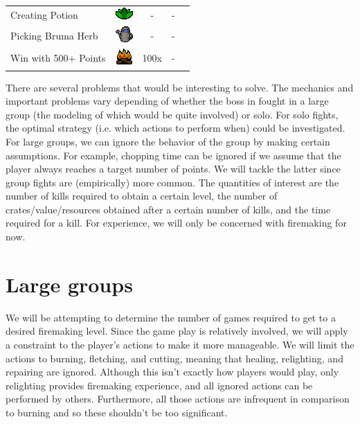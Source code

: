 \begin{table}[H]
\begin{tabular}{lcccc}
		Creating Potion                     & \includegraphics[width=0.03\linewidth]{img/general/skills/Herblore_icon.png}     & -                      & -               \\
		Picking Bruma Herb                  & \includegraphics[width=0.03\linewidth]{img/general/skills/Farming_icon.png}      & -                      & -               \\
		Win with 500+ Points                & \includegraphics[width=0.03\linewidth]{img/general/skills/Firemaking_icon.png}   & 100x                   & -              
	\end{tabular}
	\label{table:wintertodt_actions}
\end{table}

There are several problems that would be interesting to solve. The mechanics and important problems vary depending of whether the boss in fought in a large group (the modeling of which would be quite involved) or solo. For solo fights, the optimal strategy (i.e. which actions to perform when) could be investigated. For large groups, we can ignore the behavior of the group by making certain assumptions. For example, chopping time can be ignored if we assume that the player always reaches a target number of points. We will tackle the latter since group fights are (empirically) more common. The quantities of interest are the number of kills required to obtain a certain level, the number of crates/value/resources obtained after a certain number of kills, and the time required for a kill. For experience, we will only be concerned with firemaking for now.

\section{Large groups}
	We will be attempting to determine the number of games required to get to a desired firemaking level. Since the game play is relatively involved, we will apply a constraint to the player's actions to make it more manageable. We will limit the actions to burning, fletching, and cutting, meaning that healing, relighting, and repairing are ignored. Although this isn't exactly how players would play, only relighting provides firemaking experience, and all ignored actions can be performed by others. Furthermore, all those actions are infrequent in comparison to burning and so these shouldn't be too significant.

